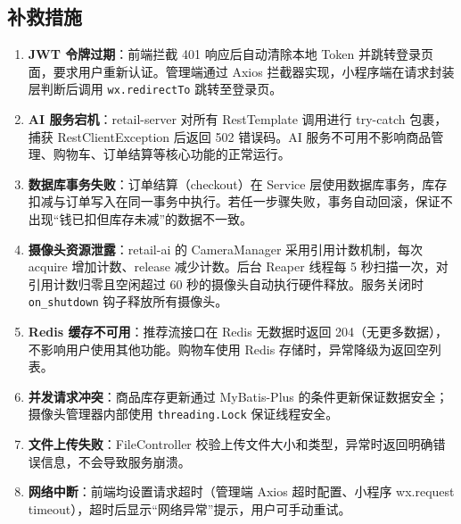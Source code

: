 \subsection{补救措施}

\begin{enumerate}[leftmargin=2em]
  \item \textbf{JWT 令牌过期}：前端拦截 401 响应后自动清除本地 Token 并跳转登录页面，要求用户重新认证。管理端通过 Axios 拦截器实现，小程序端在请求封装层判断后调用 \texttt{wx.redirectTo} 跳转至登录页。
  \item \textbf{AI 服务宕机}：retail-server 对所有 RestTemplate 调用进行 try-catch 包裹，捕获 RestClientException 后返回 502 错误码。AI 服务不可用不影响商品管理、购物车、订单结算等核心功能的正常运行。
  \item \textbf{数据库事务失败}：订单结算（checkout）在 Service 层使用数据库事务，库存扣减与订单写入在同一事务中执行。若任一步骤失败，事务自动回滚，保证不出现“钱已扣但库存未减”的数据不一致。
  \item \textbf{摄像头资源泄露}：retail-ai 的 CameraManager 采用引用计数机制，每次 acquire 增加计数、release 减少计数。后台 Reaper 线程每 5 秒扫描一次，对引用计数归零且空闲超过 60 秒的摄像头自动执行硬件释放。服务关闭时 \texttt{on\_shutdown} 钩子释放所有摄像头。
  \item \textbf{Redis 缓存不可用}：推荐流接口在 Redis 无数据时返回 204（无更多数据），不影响用户使用其他功能。购物车使用 Redis 存储时，异常降级为返回空列表。
  \item \textbf{并发请求冲突}：商品库存更新通过 MyBatis-Plus 的条件更新保证数据安全；摄像头管理器内部使用 \texttt{threading.Lock} 保证线程安全。
  \item \textbf{文件上传失败}：FileController 校验上传文件大小和类型，异常时返回明确错误信息，不会导致服务崩溃。
  \item \textbf{网络中断}：前端均设置请求超时（管理端 Axios 超时配置、小程序 wx.request timeout），超时后显示“网络异常”提示，用户可手动重试。
\end{enumerate}
